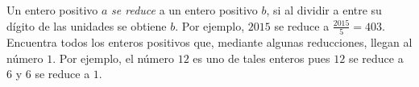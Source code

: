 Un entero positivo $a$ \emph{se reduce} a un entero positivo $b$, si al dividir a entre su dígito de las unidades se obtiene $b$. Por ejemplo, $2015$ se reduce a $\frac{2015}{5}=403$. Encuentra todos los enteros positivos que, mediante algunas reducciones, llegan al número $1$. Por ejemplo, el número $12$ es uno de tales enteros pues $12$ se reduce a $6$ y $6$ se reduce a $1$.
